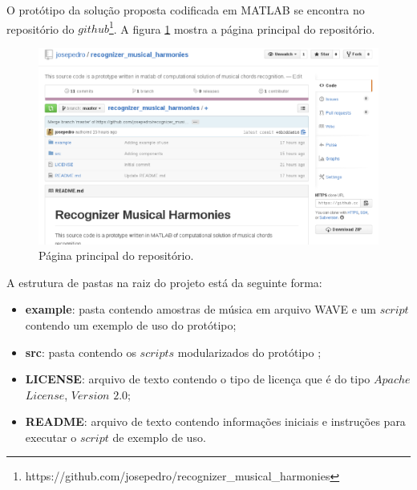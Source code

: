 O protótipo da solução proposta codificada em MATLAB se encontra no repositório do $github$\footnote{https://github.com/josepedro/recognizer\_musical\_harmonies}. A figura \ref{fig:github} mostra a página principal do repositório.

\begin{figure}[h] 
  \centering
    \includegraphics[keepaspectratio=true, scale=0.4]{figuras/github}
    \caption{Página principal do repositório.}
    \label{fig:github}
\end{figure}

A estrutura de pastas na raiz do projeto está da seguinte forma:
\begin{itemize}
	\item \textbf{example}: pasta contendo amostras de música em arquivo WAVE e um $script$ contendo um exemplo de uso do protótipo;
	\item \textbf{src}: pasta contendo os $scripts$ modularizados do protótipo ;
	\item \textbf{LICENSE}: arquivo de texto contendo o tipo de licença que é do tipo $Apache$ $License$, $Version$ $2$$.$$0$;
	\item \textbf{README}: arquivo de texto contendo informações iniciais e instruções para executar o $script$ de exemplo de uso.
\end{itemize}

